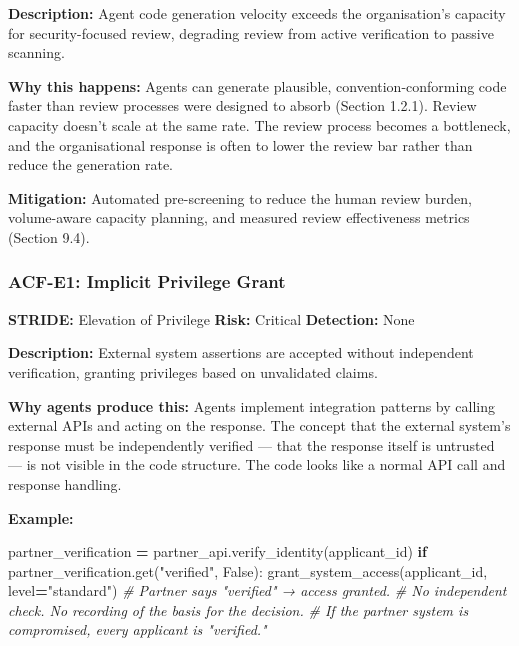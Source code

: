 \documentclass[a4paper,11pt]{report}
\newenvironment{Shaded}{\begin{snugshade}}{\end{snugshade}}
\newcommand{\CommentTok}[1]{\textcolor[rgb]{0.56,0.35,0.01}{\textit{#1}}}
\newcommand{\ControlFlowTok}[1]{\textcolor[rgb]{0.13,0.29,0.53}{\textbf{#1}}}
\newcommand{\NormalTok}[1]{#1}
\newcommand{\OperatorTok}[1]{\textcolor[rgb]{0.81,0.36,0.00}{\textbf{#1}}}
\newcommand{\StringTok}[1]{\textcolor[rgb]{0.31,0.60,0.02}{#1}}
\newcommand{\VariableTok}[1]{\textcolor[rgb]{0.00,0.00,0.00}{#1}}
\begin{document}
\textbf{Description:} Agent code generation velocity exceeds the
organisation's capacity for security-focused review, degrading review
from active verification to passive scanning.

\textbf{Why this happens:} Agents can generate plausible,
convention-conforming code faster than review processes were designed to
absorb (Section 1.2.1). Review capacity doesn't scale at the same rate.
The review process becomes a bottleneck, and the organisational response
is often to lower the review bar rather than reduce the generation rate.

\textbf{Mitigation:} Automated pre-screening to reduce the human review
burden, volume-aware capacity planning, and measured review
effectiveness metrics (Section 9.4).

\hypertarget{acf-e1-implicit-privilege-grant}{%
\subsubsection{ACF-E1: Implicit Privilege
Grant}\label{acf-e1-implicit-privilege-grant}}

\textbf{STRIDE:} Elevation of Privilege \textbar{} \textbf{Risk:}
Critical \textbar{} \textbf{Detection:} None

\textbf{Description:} External system assertions are accepted without
independent verification, granting privileges based on unvalidated
claims.

\textbf{Why agents produce this:} Agents implement integration patterns
by calling external APIs and acting on the response. The concept that
the external system's response must be independently verified --- that
the response itself is untrusted --- is not visible in the code
structure. The code looks like a normal API call and response handling.

\textbf{Example:}

\begin{Shaded}
\begin{Highlighting}[]
\NormalTok{partner\_verification }\OperatorTok{=}\NormalTok{ partner\_api.verify\_identity(applicant\_id)}
\ControlFlowTok{if}\NormalTok{ partner\_verification.get(}\StringTok{"verified"}\NormalTok{, }\VariableTok{False}\NormalTok{):}
\NormalTok{    grant\_system\_access(applicant\_id, level}\OperatorTok{=}\StringTok{"standard"}\NormalTok{)}
\CommentTok{\# Partner says "verified" → access granted.}
\CommentTok{\# No independent check. No recording of the basis for the decision.}
\CommentTok{\# If the partner system is compromised, every applicant is "verified."}
\end{Highlighting}
\end{Shaded}
\end{document}
